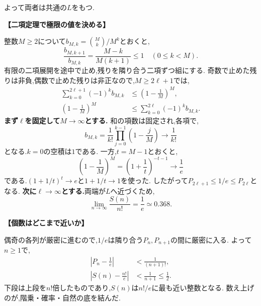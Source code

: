 \begin{enumerate}[label=\textbf{問\arabic*.},leftmargin=3.8em,format=\bookitemlink{practice-entrance}{solution}{problem}]
                  よって両者は共通の$L$をもつ.
                  \par\smallskip\noindent\textbf{【二項定理で極限の値を決める】}\par\nopagebreak[4]
                  整数$M\ge2$について$b_{M,k}=\binom Mk/M^k$とおくと,
                  \[
                    \frac{b_{M,k+1}}{b_{M,k}}=\frac{M-k}{M(k+1)}\le1
                    \quad(0\le k<M).
                  \]
                  有限の二項展開を途中で止め,残りを隣り合う二項ずつ組にする.
                  奇数で止めた残りは非負,偶数で止めた残りは非正なので,$M\ge2\ell+1$では,
                  \[
                  \begin{aligned}
                    \sum_{k=0}^{2\ell+1}(-1)^kb_{M,k}
                      &\le\left(1-\frac1M\right)^M,\\
                    \left(1-\frac1M\right)^M
                      &\le\sum_{k=0}^{2\ell}(-1)^kb_{M,k}.
                  \end{aligned}
                  \]
                  \textbf{まず$\ell$を固定して$M\to\infty$とする.}
                  和の項数は固定され,各項で,
                  \[
                    b_{M,k}=\frac1{k!}\prod_{j=0}^{k-1}\left(1-\frac jM\right)
                      \longrightarrow\frac1{k!}
                  \]
                  となる.$k=0$の空積は$1$である.
                  一方,$t=M-1$とおくと,
                  \[
                    \left(1-\frac1M\right)^M=\left(1+\frac1t\right)^{-t-1}
                      \longrightarrow\frac1e
                  \]
                  である.$(1+1/t)^t\to e$と$1+1/t\to1$を使った.
                  したがって$P_{2\ell+1}\le1/e\le P_{2\ell}$となる.
                  \textbf{次に$\ell\to\infty$とする.}両端が$L$へ近づくため,
                  \[
                    \boxed{\lim_{n\to\infty}\frac{S(n)}{n!}=\frac1e\simeq0.368}.
                  \]
                  \par\smallskip\noindent\textbf{【個数はどこまで近いか】}\par\nopagebreak[4]
                  偶奇の各列が厳密に進むので,$1/e$は隣り合う$P_n,P_{n+1}$の間に厳密に入る.
                  よって$n\ge1$で,
                  \[
                  \begin{aligned}
                    \left|P_n-\frac1e\right|&<\frac1{(n+1)!},\\
                    \left|S(n)-\frac{n!}e\right|&<\frac1{n+1}\le\frac12.
                  \end{aligned}
                  \]
                  下段は上段を$n!$倍したものであり,$S(n)$は$n!/e$に最も近い整数となる.
                  数え上げのが,階乗・確率・自然の底を結んだ.
        \end{enumerate}
